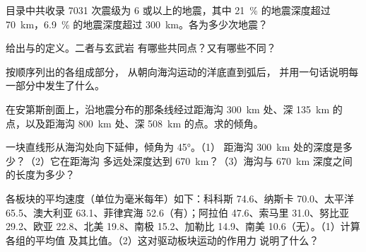 \begin{exercise}[$\star$]\label{exo:g11:subduction-zones:3}
目录中共收录 \num{7031} 次震级为 6 或以上的地震，其中
\qty{21}{\percent} 的地震深度超过 \qty{70}{km}，\qty{6.9}{\percent}
的地震深度超过 \qty{300}{km}。各为多少次地震？
\end{exercise}

\begin{exercise}[$\star$]\label{exo:g11:subduction-zones:4}
给出与的定义。二者与玄武岩
有哪些共同点？又有哪些不同？
\end{exercise}

\begin{exercise}[$\star$]\label{exo:g11:subduction-zones:5}
按顺序列出的各组成部分，
从朝向海沟运动的洋底直到弧后，
并用一句话说明每一部分中发生了什么。
\end{exercise}

\begin{exercise}[$\star\star$]\label{exo:g11:subduction-zones:6}
在安第斯剖面上，沿地震分布的那条线经过距海沟
\qty{300}{km} 处、深 \qty{135}{km} 的点，以及距海沟
\qty{800}{km} 处、深 \qty{508}{km} 的点。求的倾角。
\end{exercise}

\begin{exercise}[$\star\star$]\label{exo:g11:subduction-zones:7}
一块直线形从海沟处向下延伸，倾角为 \ang{45}。（1）
距海沟 \qty{300}{km} 处的深度是多少？（2）它在距海沟
多远处深度达到 \qty{670}{km}？（3）海沟与
\qty{670}{km} 深度之间的长度为多少？
\end{exercise}

\begin{exercise}[$\star\star$]\label{exo:g11:subduction-zones:8}
各板块的平均速度（单位为毫米每年）如下：科科斯 74.6、纳斯卡
70.0、太平洋 65.5、澳大利亚 63.1、菲律宾海 52.6（有）；阿拉伯
47.6、索马里 31.0、努比亚 29.2、欧亚 22.8、北美 19.8、南极
15.2、加勒比 14.9、南美 10.6（无）。（1）计算各组的平均值
及其比值。（2）这对驱动板块运动的作用力
说明了什么？
\end{exercise}


